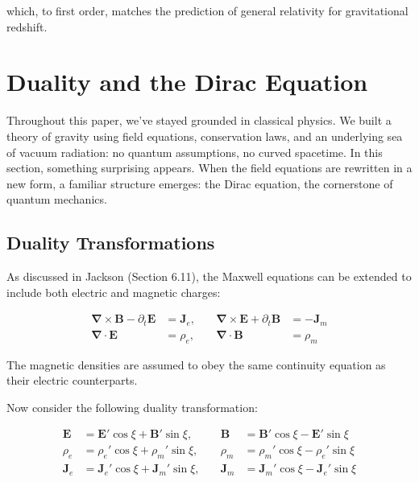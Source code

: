 \documentclass {article}
\renewcommand\vec{\mathbf}
\let\OldS\nabla
\renewcommand{\nabla}{\boldsymbol{\OldS}}
\begin{document}
which, to first order, matches the prediction of general relativity for gravitational redshift.

		
\section{Duality and the Dirac Equation}

Throughout this paper, we’ve stayed grounded in classical physics. We built a theory of gravity using field equations, conservation laws, and an underlying sea of vacuum radiation: no quantum assumptions, no curved spacetime. In this section, something surprising appears. When the field equations are rewritten in a new form, a familiar structure emerges: the Dirac equation, the cornerstone of quantum mechanics.

\subsection{Duality Transformations}

As discussed in Jackson (Section 6.11), the Maxwell equations can be extended to include both electric and magnetic charges:

\begin{equation}
\begin{aligned}
\nabla \times \vec{B} - \partial_t \vec{E} &= \vec{J}_e, \quad
&\nabla \times \vec{E} + \partial_t \vec{B} &= -\vec{J}_m \\
\nabla \cdot \vec{E} &= \rho_e, \quad
&\nabla \cdot \vec{B} &= \rho_m
\end{aligned}
\end{equation}


The magnetic densities are assumed to obey the same continuity equation as their electric counterparts.

Now consider the following duality transformation:

\begin{equation}
\begin{aligned}
\vec{E} &= \vec{E}' \cos \xi + \vec{B}' \sin \xi, \quad
&\vec{B} &= \vec{B}' \cos \xi - \vec{E}' \sin \xi \\
\rho_e &= \rho_e' \cos \xi + \rho_m' \sin \xi, \quad
&\rho_m &= \rho_m' \cos \xi - \rho_e' \sin \xi \\
\vec{J}_e &= \vec{J}_e' \cos \xi + \vec{J}_m' \sin \xi, \quad
&\vec{J}_m &= \vec{J}_m' \cos \xi - \vec{J}_e' \sin \xi
\end{aligned}
\end{equation}
\end{document}
